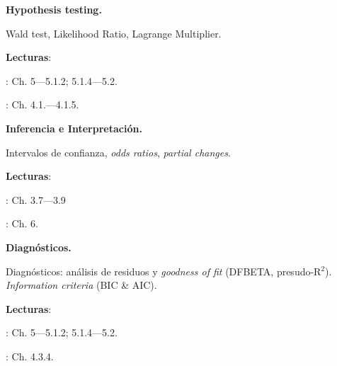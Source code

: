 \documentclass[letterpaper]{article}
\renewenvironment{itemize}{
  \begin{list}{}{
    \setlength{\leftmargin}{1.5em}
  }
}{
  \end{list}
}
\begin{document}
\begin{enumerate}[label=\roman*.]
     
       \begin{itemize} 
        \item[12.] {\bf Hypothesis testing.}
        \begin{itemize} 
          \item[$\circ$] \emph{} Wald test, Likelihood Ratio, Lagrange Multiplier.
          \item[$\circ$] {\bf Lecturas}: 
            \begin{itemize} 
              \item[$\diamond$] \textcite{Ward2018}: Ch. 5---5.1.2; 5.1.4---5.2.
              \item[$\diamond$] \textcite{Long2001}: Ch. 4.1.---4.1.5.
            \end{itemize}
        \end{itemize}
      \end{itemize}


        \begin{itemize} 
        \item[13.] {\bf Inferencia e Interpretaci\'on.}
        \begin{itemize} 
          \item[$\circ$] Intervalos de confianza, \emph{odds ratios}, \emph{partial changes}.
          \item[$\circ$] {\bf Lecturas}: 
            \begin{itemize} 
              \item[$\diamond$] \textcite{Long2001}: Ch. 3.7---3.9
              \item[$\diamond$] \textcite{Ward2018}: Ch. 6.
            \end{itemize}
        \end{itemize}
      \end{itemize}


       \begin{itemize} 
        \item[14.] {\bf Diagn\'osticos.}
        \begin{itemize} 
          \item[$\circ$] Diagn\'osticos: an\'alisis de residuos y \emph{goodness of fit} (DFBETA, presudo-R$^{2}$). \emph{Information criteria} (BIC \& AIC).
          \item[$\circ$] {\bf Lecturas}: 
            \begin{itemize} 
              \item[$\diamond$] \textcite{Ward2018}: Ch. 5---5.1.2; 5.1.4---5.2.
              \item[$\diamond$] \textcite{Long2001}: Ch. 4.3.4.
            \end{itemize}
        \end{itemize}
      \end{itemize}
			


\end{enumerate}
\end{document}
